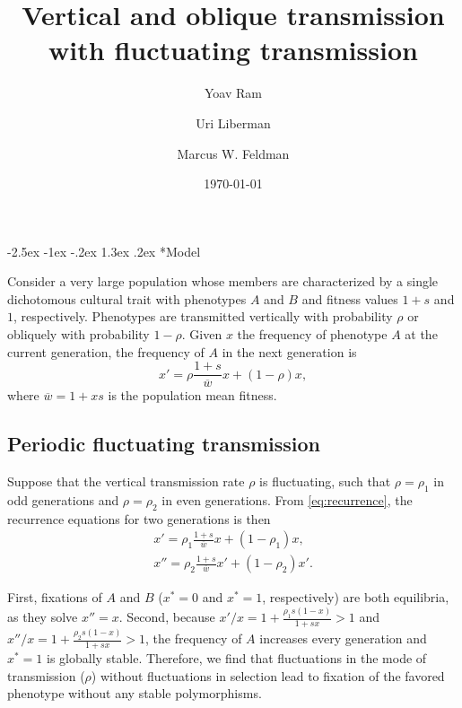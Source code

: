 \documentclass[12pt]{extarticle} %
\title{Vertical and oblique transmission with fluctuating transmission}
\author[a]{Yoav Ram}
\author[b]{Uri Liberman}
\author[a]{Marcus W. Feldman}
\affil[a]{Department of Biology, Stanford University, Stanford, CA}
\affil[b]{School of Mathematical Sciences, Tel Aviv University, Israel}
\date{\today}
\makeatletter
\renewcommand\section{\@startsection {section}{1}{\z@}%
     {-2.5ex \@plus -1ex \@minus -.2ex}%
     {1.3ex \@plus.2ex}%
    {\Large\bfseries}}
\makeatother
\begin{document}
\maketitle




\section*{Model}

Consider a very large population whose members are characterized by a single dichotomous cultural trait with phenotypes $A$ and $B$ and fitness values $1+s$ and $1$, respectively.
Phenotypes are transmitted vertically with probability $\rho$ or obliquely with probability $1-\rho$.
Given $x$ the frequency of phenotype $A$ at the current generation, the frequency of $A$ in the next generation is
\begin{equation} \label{eq:recurrence}
x' = \rho \frac{1+s}{\overline w} x + (1-\rho)x,
\end{equation}
where $\overline w = 1 + xs$ is the population mean fitness.

\subsection*{Periodic fluctuating transmission}

Suppose that the vertical transmission rate $\rho$ is fluctuating, such that $\rho = \rho_1$ in odd generations and $\rho = \rho_2$ in even generations.
From \eqref{eq:recurrence}, the recurrence equations for two generations is then
\begin{equation}\begin{aligned} \label{eq:recurrence_two_generations}
x' = \rho_1 \frac{1+s}{\overline w} x + (1-\rho_1)x, \\
x'' = \rho_2 \frac{1+s}{\overline w} x' + (1-\rho_2)x'.
\end{aligned}\end{equation}

First, fixations of $A$ and $B$ ($x^*=0$ and $x^*=1$, respectively) are both equilibria, as they solve $x''=x$.
Second, because $x'/x = 1+\frac{\rho_1 s (1-x)}{1+sx} > 1$ and $x''/x = 1+\frac{\rho_2 s (1-x)}{1+sx} > 1$, the frequency of $A$ increases every generation and $x^*=1$ is globally stable.
Therefore, we find that fluctuations in the mode of transmission ($\rho$) without fluctuations in selection lead to fixation of the favored phenotype without any stable polymorphisms.
\end{document}
